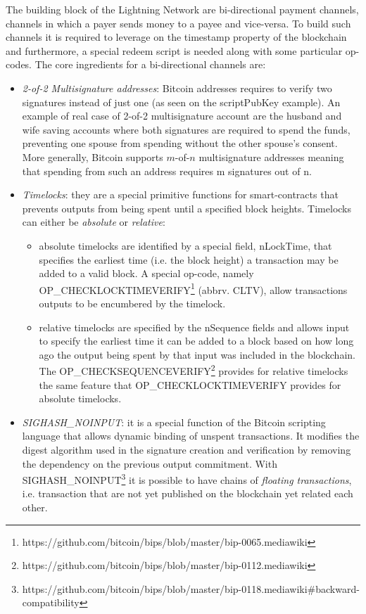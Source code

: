		The building block of the Lightning Network are bi-directional payment channels, channels in which a payer sends money to a payee and vice-versa. To build such channels it is required to leverage on the timestamp property of the blockchain and furthermore, a special redeem script is needed along with some particular op-codes. The core ingredients for a bi-directional channels are:
		\begin{itemize}
			\item \textit{2-of-2 Multisignature addresses}: Bitcoin addresses requires to verify two signatures instead of just one (as seen on the scriptPubKey example). An example of real case of 2-of-2 multisignature account are the husband and wife saving accounts where both signatures are required to spend the funds, preventing one spouse from spending without the other spouse's consent. More generally, Bitcoin supports $m$-of-$n$ multisignature addresses meaning that spending from such an address requires m signatures out of n.
			
			\item \textit{Timelocks}: they are a special primitive functions for smart-contracts that prevents outputs from being spent until a specified block heights. Timelocks can either be \textit{absolute} or \textit{relative}:
			\begin{itemize}
				\item absolute timelocks are identified by a special field, nLockTime, that specifies the earliest time (i.e. the block height) a transaction may be added to a valid block. A special op-code, namely OP\_CHECKLOCKTIMEVERIFY\footnote{https://github.com/bitcoin/bips/blob/master/bip-0065.mediawiki} (abbrv. CLTV), allow transactions outputs to be encumbered by the timelock. 
				
				\item relative timelocks are specified by the nSequence fields and allows input to specify the earliest time it can be added to a block based on how long ago the output being spent by that input was included in the blockchain. The OP\_CHECKSEQUENCEVERIFY\footnote{https://github.com/bitcoin/bips/blob/master/bip-0112.mediawiki} provides for relative timelocks the same feature that OP\_CHECKLOCKTIMEVERIFY provides for absolute timelocks.
			\end{itemize}	
			
			\item \textit{SIGHASH\_NOINPUT}: it is a special function of the Bitcoin scripting language that allows dynamic binding of unspent transactions. It modifies the digest algorithm used in the signature creation and verification by removing the dependency on the previous output commitment. With SIGHASH\_NOINPUT\footnote{https://github.com/bitcoin/bips/blob/master/bip-0118.mediawiki\#backward-compatibility} it is possible to have chains of \textit{floating transactions}, i.e. transaction that are not yet published on the blockchain yet related each other.
		\end{itemize}
		
